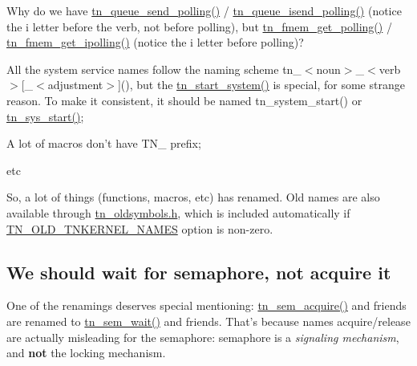 \begin{DoxyItemize}
\item Why do we have {\ttfamily \hyperlink{tn__dqueue_8h_af60c61c12ed90f4bcc7d13ca4da8562b}{tn\+\_\+queue\+\_\+send\+\_\+polling()}} / {\ttfamily \hyperlink{tn__dqueue_8h_ac059f15f07625ca25e4aac5790cce1ea}{tn\+\_\+queue\+\_\+isend\+\_\+polling()}} (notice the {\ttfamily i} letter before the verb, not before {\ttfamily polling}), but {\ttfamily \hyperlink{tn__fmem_8h_affea42ad41734fadfe8170b4234ca567}{tn\+\_\+fmem\+\_\+get\+\_\+polling()}} / {\ttfamily \hyperlink{tn__oldsymbols_8h_a4293c359514306825a9007f071b2ad3f}{tn\+\_\+fmem\+\_\+get\+\_\+ipolling()}} (notice the {\ttfamily i} letter before {\ttfamily polling})?
\item All the system service names follow the naming scheme {\ttfamily tn\+\_\+$<$noun$>$\+\_\+$<$verb$>$\mbox{[}\+\_\+$<$adjustment$>$\mbox{]}()}, but the {\ttfamily \hyperlink{tn__oldsymbols_8h_a566625be14a6eed4a3574e3d31e776fc}{tn\+\_\+start\+\_\+system()}} is special, for some strange reason. To make it consistent, it should be named {\ttfamily tn\+\_\+system\+\_\+start()} or {\ttfamily \hyperlink{tn__sys_8h_a62ab25d9d8ca01c02d368968f19e49bf}{tn\+\_\+sys\+\_\+start()}};
\item A lot of macros don't have {\ttfamily T\+N\+\_\+} prefix;
\item etc
\end{DoxyItemize}

So, a lot of things (functions, macros, etc) has renamed. Old names are also available through {\ttfamily \hyperlink{tn__oldsymbols_8h}{tn\+\_\+oldsymbols.\+h}}, which is included automatically if {\ttfamily \hyperlink{tn__cfg__default_8h_ae9854c723c6a823c9126aa8390977d39}{T\+N\+\_\+\+O\+L\+D\+\_\+\+T\+N\+K\+E\+R\+N\+E\+L\+\_\+\+N\+A\+M\+E\+S}} option is non-\/zero.\hypertarget{tnkernel_diff_tnkernel_diff_api_rename_sem}{}\subsection{We should wait for semaphore, not acquire it}\label{tnkernel_diff_tnkernel_diff_api_rename_sem}
One of the renamings deserves special mentioning\+: {\ttfamily \hyperlink{tn__oldsymbols_8h_abdc5c428590ff525cdb566da613015ce}{tn\+\_\+sem\+\_\+acquire()}} and friends are renamed to {\ttfamily \hyperlink{tn__sem_8h_acfed2a27719c87638d2eb6edfdeea150}{tn\+\_\+sem\+\_\+wait()}} and friends. That's because names acquire/release are actually misleading for the semaphore\+: semaphore is a {\itshape signaling mechanism}, and {\bfseries not} the locking mechanism.

